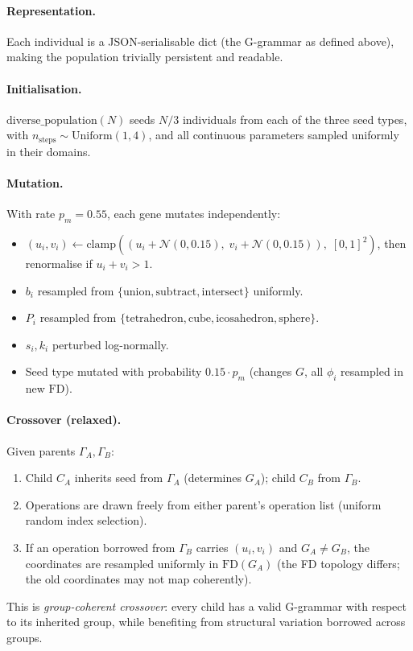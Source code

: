 \documentclass[11pt, a4paper]{article}
\newcommand{\FD}{\mathrm{FD}}
\begin{document}
\paragraph{Representation.}
Each individual is a JSON-serialisable dict (the G-grammar as defined above),
making the population trivially persistent and readable.

\paragraph{Initialisation.}
$\mathrm{diverse\_population}(N)$ seeds $N/3$ individuals from each of the
three seed types, with $n_{\mathrm{steps}} \sim \mathrm{Uniform}(1,4)$,
and all continuous parameters sampled uniformly in their domains.

\paragraph{Mutation.}
With rate $p_m = 0.55$, each gene mutates independently:
\begin{itemize}
  \item $(u_i, v_i) \leftarrow \mathrm{clamp}((u_i + \mathcal{N}(0, 0.15),\; v_i + \mathcal{N}(0, 0.15)),\; [0,1]^2)$, then renormalise if $u_i + v_i > 1$.
  \item $b_i$ resampled from $\{\mathrm{union, subtract, intersect}\}$ uniformly.
  \item $P_i$ resampled from $\{\mathrm{tetrahedron, cube, icosahedron, sphere}\}$.
  \item $s_i, k_i$ perturbed log-normally.
  \item Seed type mutated with probability $0.15 \cdot p_m$ (changes $G$, all $\phi_i$ resampled in new $\FD$).
\end{itemize}

\paragraph{Crossover (relaxed).}
Given parents $\Gamma_A, \Gamma_B$:
\begin{enumerate}
  \item Child $C_A$ inherits seed from $\Gamma_A$ (determines $G_A$); child $C_B$ from $\Gamma_B$.
  \item Operations are drawn freely from either parent's operation list (uniform random index selection).
  \item If an operation borrowed from $\Gamma_B$ carries $(u_i, v_i)$ and $G_A \neq G_B$, the coordinates are resampled uniformly in $\FD(G_A)$ (the FD topology differs; the old coordinates may not map coherently).
\end{enumerate}
This is \emph{group-coherent crossover}: every child has a valid G-grammar
with respect to its inherited group, while benefiting from structural
variation borrowed across groups.
\end{document}
